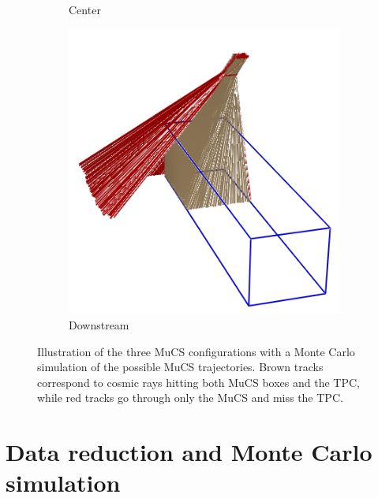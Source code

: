 \documentclass[a4paper,11pt]{article}
\begin{document}
\begin{figure}[htbp]
\begin{subfigure}{0.30\textwidth}
    \caption{Center} \label{fig:centre}
  \end{subfigure}
  \begin{subfigure}{0.30\textwidth}
    \includegraphics[width=\linewidth]{figures/downstream.png}
    \caption{Downstream} \label{fig:downstream}
  \end{subfigure}

  \caption{Illustration of the three MuCS configurations with a Monte Carlo simulation of the possible MuCS trajectories. Brown tracks correspond to cosmic rays hitting both MuCS boxes and the TPC, while red tracks go through only the MuCS and miss the TPC.} \label{fig:mucs}
\end{figure}


\section{Data reduction and Monte Carlo simulation}\label{sec:merging}
\end{document}
